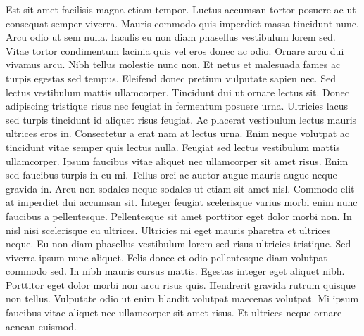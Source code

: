 \documentclass[12pt]{article}
\begin{document}
\par Est sit amet facilisis magna etiam tempor. Luctus accumsan tortor posuere ac ut consequat semper viverra. Mauris commodo quis imperdiet massa tincidunt nunc. Arcu odio ut sem nulla. Iaculis eu non diam phasellus vestibulum lorem sed. Vitae tortor condimentum lacinia quis vel eros donec ac odio. Ornare arcu dui vivamus arcu. Nibh tellus molestie nunc non. Et netus et malesuada fames ac turpis egestas sed tempus. Eleifend donec pretium vulputate sapien nec. Sed lectus vestibulum mattis ullamcorper. Tincidunt dui ut ornare lectus sit. Donec adipiscing tristique risus nec feugiat in fermentum posuere urna. Ultricies lacus sed turpis tincidunt id aliquet risus feugiat. Ac placerat vestibulum lectus mauris ultrices eros in. Consectetur a erat nam at lectus urna. Enim neque volutpat ac tincidunt vitae semper quis lectus nulla. Feugiat sed lectus vestibulum mattis ullamcorper. Ipsum faucibus vitae aliquet nec ullamcorper sit amet risus. Enim sed faucibus turpis in eu mi. Tellus orci ac auctor augue mauris augue neque gravida in. Arcu non sodales neque sodales ut etiam sit amet nisl. Commodo elit at imperdiet dui accumsan sit. Integer feugiat scelerisque varius morbi enim nunc faucibus a pellentesque. Pellentesque sit amet porttitor eget dolor morbi non. In nisl nisi scelerisque eu ultrices. Ultricies mi eget mauris pharetra et ultrices neque. Eu non diam phasellus vestibulum lorem sed risus ultricies tristique. Sed viverra ipsum nunc aliquet. Felis donec et odio pellentesque diam volutpat commodo sed. In nibh mauris cursus mattis. Egestas integer eget aliquet nibh. Porttitor eget dolor morbi non arcu risus quis. Hendrerit gravida rutrum quisque non tellus. Vulputate odio ut enim blandit volutpat maecenas volutpat. Mi ipsum faucibus vitae aliquet nec ullamcorper sit amet risus. Et ultrices neque ornare aenean euismod.
\end{document}
